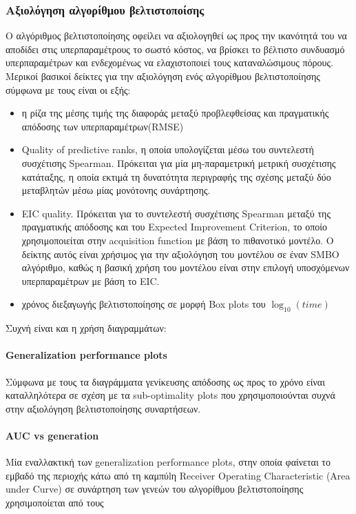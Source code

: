 \documentclass[]{article}
\numberwithin{equation}{section}		%
\numberwithin{figure}{section}			%
\numberwithin{table}{section}				%
\begin{document}
	\subsubsection{Αξιολόγηση αλγορίθμου βελτιστοποίσης}
	Ο αλγόριθμος βελτιστοποίησης οφείλει να αξιολογηθεί ως προς την ικανότητά του να αποδίδει στις υπερπαραμέτρους το σωστό κόστος, να βρίσκει το βέλτιστο συνδυασμό υπερπαραμέτρων και ενδεχομένως να ελαχιστοποιεί τους καταναλώσιμους πόρους. Μερικοί βασικοί δείκτες για την αξιολόγηση ενός αλγορίθμου βελτιστοποίησης σύμφωνα με τους \citet{HutHooLeyMur10} είναι οι εξής:
	\begin{itemize}
		\item η ρίζα της μέσης τιμής της διαφοράς μεταξύ προβλεφθείσας και πραγματικής απόδοσης των υπερπαραμέτρων(RMSE)
		\item Quality of predictive ranks, η οποία υπολογίζεται μέσω του συντελεστή συσχέτισης Spearman. Πρόκειται για μία μη-παραμετρική μετρική συσχέτισης κατάταξης, η οποία εκτιμά τη δυνατότητα περιγραφής της σχέσης μεταξύ δύο μεταβλητών μέσω μίας μονότονης συνάρτησης.
		\item EIC quality. Πρόκειται για το συντελεστή συσχέτισης Spearman μεταξύ της πραγματικής απόδοσης και του Expected Improvement Criterion, το οποίο χρησιμοποιείται στην acquisition function με βάση το πιθανοτικό μοντέλο. Ο δείκτης αυτός είναι χρήσιμος για την αξιολόγηση του μοντέλου σε έναν SMBO αλγόριθμο, καθώς η βασική χρήση του μοντέλου είναι στην επιλογή υποσχόμενων υπερπαραμέτρων με βάση το EIC.
		\item χρόνος διεξαγωγής βελτιστοποίησης σε μορφή Box plots του $\log_{10} (time)$
	\end{itemize}
	
	Συχνή είναι και η χρήση διαγραμμάτων:
	
	\paragraph{Generalization performance plots}
	Σύμφωνα με τους \citet{wassenberg} τα διαγράμματα γενίκευσης απόδοσης ως προς το χρόνο είναι καταλληλότερα σε σχέση με τα sub-optimality plots που χρησιμοποιούνται συχνά στην αξιολόγηση βελτιστοποίησης συναρτήσεων.
	
	
	\paragraph{AUC vs generation}
	Μία εναλλακτική των generalization performance plots, στην οποία φαίνεται το εμβαδό της περιοχής κάτω από τη καμπύlη Receiver Operating Characteristic (Area under Curve) σε συνάρτηση των γενεών του αλγορίθμου βελτιστοποίησης χρησιμοποίεται από τους \citet{1554741}
	
\end{document}
